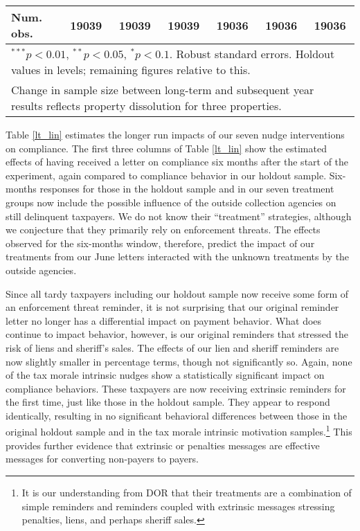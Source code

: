 \documentclass[12pt]{article}
\begin{document}
\begin{table}[htbp]
\begin{center}
\begin{tabular}{l c c c c c c }
\hline
Num. obs.    & 19039        & 19039        & 19039         & 19036        & 19036        & 19036          \\
\hline
\multicolumn{7}{l}{\scriptsize{$^{***}p<0.01$, $^{**}p<0.05$, $^*p<0.1$. Robust standard errors. Holdout values in levels; remaining figures relative to this.}} \\
\multicolumn{7}{l}{\scriptsize{Change in sample size between long-term and subsequent year results reflects property dissolution for three properties.}}
\end{tabular}
\end{center}
\end{table}


Table \ref{lt_lin} estimates the longer run impacts of our seven nudge
interventions on compliance.  The first three columns of Table
\ref{lt_lin} show the estimated effects of having received a letter on
compliance six months after the start of the experiment, again
compared to compliance behavior in our holdout sample.  Six-months
responses for those in the holdout sample and in our seven treatment
groups now include the possible influence of the outside collection
agencies on still delinquent taxpayers. We do not know their
``treatment'' strategies, although we conjecture that they primarily
rely on enforcement threats. The effects observed for the six-months
window, therefore, predict the impact of our treatments from our June
letters interacted with the unknown treatments by the outside
agencies.

Since all tardy taxpayers including our holdout sample now receive
some form of an enforcement threat reminder, it is not surprising that
our original reminder letter no longer has a differential impact on
payment behavior. What does continue to impact behavior, however, is
our original reminders that stressed the risk of liens and sheriff's
sales. The effects of our lien and sheriff reminders are now slightly
smaller in percentage terms, though not significantly so. Again, none
of the tax morale intrinsic nudges show a statistically significant
impact on compliance behaviors.  These taxpayers are now receiving
extrinsic reminders for the first time, just like those in the holdout
sample. They appear to respond identically, resulting in no
significant behavioral differences between those in the original
holdout sample and in the tax morale intrinsic motivation
samples.\footnote{It is our understanding from DOR that their
  treatments are a combination of simple reminders and reminders
  coupled with extrinsic messages stressing penalties, liens, and
  perhaps sheriff sales.}  This provides further evidence that
extrinsic or penalties messages are effective messages for converting
non-payers to payers.
\end{document}
